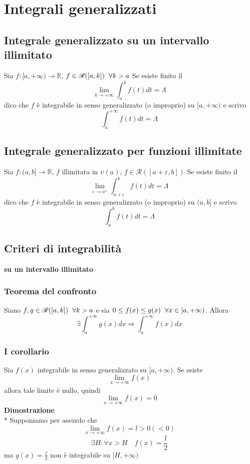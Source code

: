 \documentclass[12pt]{article}
\begin{document}
\section{Integrali generalizzati}

\subsection{Integrale generalizzato su un intervallo illimitato}
Sia $f: [a, +\infty) \to \mathbb{R}$, $f \in \mathscr{R} ([a,k]) \hspace*{0.2cm} \forall k>a$
Se esiste finito il 
\[ \lim_{k \to +\infty} \int_a^k f(t) dt = \Lambda \] dico che $f$ è integrabile in senso generalizzato (o improprio) su $[a, +\infty)$ e scrivo 
\[ \int_a^{+\infty} f(t)dt = \Lambda \]

\subsection{Integrale generalizzato per funzioni illimitate}
Sia $f: (a, b] \to \mathbb{R}$, $f$ illimitata in $\upsilon (a)$, $f \in \mathscr{R} ([a+\varepsilon, b])$ Se esiste finito il 
\[ \lim_{\varepsilon \to o^+} \int_{a +\varepsilon}^b f(t) dt = \Lambda\] 
dico che $f$ è integrabile in senso generalizzato (o improprio) su $(a,b]$ e scrivo
\[ \int_a^b f(t) dt = \Lambda \]

\subsection{Criteri di integrabilità}
\textbf{su un intervallo illimitato}
\subsubsection{Teorema del confronto}
Siano $f, g \in \mathscr{R}([a,k]) \hspace*{0.2cm} \forall k>a$ e sia $0 \leq f(x) \leq g(x) \hspace*{0.2cm} \forall x \in [a, +\infty )$. Allora
\[ \exists \int_a^{+\infty} g(x) dx \Rightarrow \int_a^{+\infty} f(x) dx\]
\subsubsection{I corollario}
Sia $f(x)$ integrabile in senso generalizzato su $[a, +\infty)$. Se esiste
\[ \lim_{x\to +\infty} f(x)\]
allora tale limite è nullo, quindi
\[\lim_{x\to +\infty} f(x) = 0 \]
\textbf{Dimostrazione}\\*
Supponiamo per assurdo che
\[\lim_{x\to +\infty} f(x) = l > 0 (<0)\]
\[\exists H : \forall x > H \quad f(x) = \frac{l}{2}\]
ma $g(x) = \frac{l}{2}$ non è integrabile su $[H, +\infty)$
\end{document}
